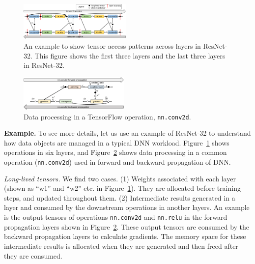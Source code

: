 


\begin{figure}
\centering
\includegraphics[width=0.49\textwidth]{figures/tensor_usage.pdf}
\vspace{-20pt}
\caption{\textcolor{check}{An example to show tensor access patterns across layers in ResNet-32. This figure shows the first three layers and the last three layers in ResNet-32}.}
\vspace{-5pt}
\label{fig:tensor_usage}
\end{figure}
\begin{figure}
\centering
\includegraphics[width=0.48\textwidth]{figures/conv_tensor_usage.pdf}
\vspace{-20pt}
\caption{\textcolor{check}{Data processing in a TensorFlow operation, \texttt{nn.conv2d}.}}
\vspace{-10pt}
\label{fig:conv_tensor_usage}
\end{figure}


\textcolor{check}{
\textbf{Example.} %
\textcolor{dong2}{To see more details, let us use an example of ResNet-32 }
to understand how data objects are managed in a typical DNN workload. Figure~\ref{fig:tensor_usage} shows operations in six layers, and Figure~\ref{fig:conv_tensor_usage} shows data processing in a common operation (\texttt{nn.conv2d}) used in forward and backward propagation of DNN. }

\textcolor{check}{\textit{Long-lived tensors.} We find two cases. (1) Weights associated with each layer (shown as ``w1'' and ``w2'' etc. in Figure~\ref{fig:tensor_usage}). They are allocated before training steps, and updated throughout them.  (2) Intermediate results generated in a layer and consumed by the downstream operations in another layers. An example is the output tensors of operations \texttt{nn.conv2d} and \texttt{nn.relu} in the forward propagation layers shown in Figure~\ref{fig:conv_tensor_usage}. These output tensors are consumed %
\textcolor{dong2}{by the backward propagation layers to calculate gradients.}
The memory space for these intermediate results is allocated when they are generated and then freed after they are consumed.}


